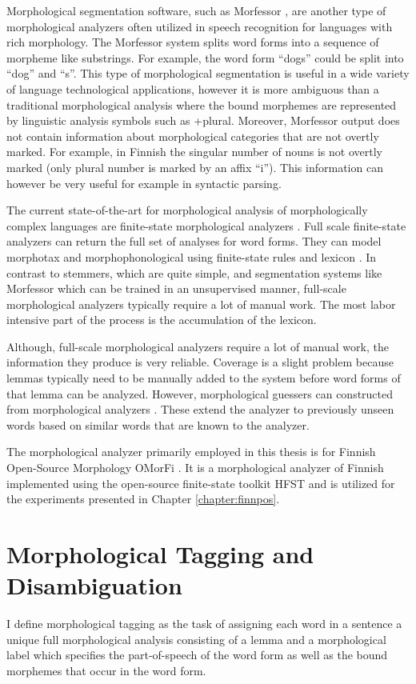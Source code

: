Morphological segmentation software, such as Morfessor
\cite{Creutz2002}, are another type of morphological analyzers often
utilized in speech recognition for languages with rich morphology. The
Morfessor system splits word forms into a sequence of morpheme like
substrings. For example, the word form ``dogs'' could be split into
``dog'' and ``s''.  This type of morphological segmentation is useful
in a wide variety of language technological applications, however it
is more ambiguous than a traditional morphological analysis where the
bound morphemes are represented by linguistic analysis symbols such as
+plural. Moreover, Morfessor output does not contain information about
morphological categories that are not overtly marked. For example, in
Finnish the singular number of nouns is not overtly marked (only
plural number is marked by an affix ``i''). This information can
however be very useful for example in syntactic parsing.

The current state-of-the-art for morphological analysis of
morphologically complex languages are finite-state morphological
analyzers \citep{Kaplan1994,Koskenniemi1984}. Full scale finite-state
analyzers can return the full set of analyses for word forms. They can
model morphotax and morphophonological using finite-state rules and
lexicon \citep{Beesley2003}. In contrast to stemmers, which are quite
simple, and segmentation systems like Morfessor which can be trained
in an unsupervised manner, full-scale morphological analyzers
typically require a lot of manual work. The most labor intensive part
of the process is the accumulation of the lexicon. 

Although, full-scale morphological analyzers require a lot of manual
work, the information they produce is very reliable. Coverage is a
slight problem because lemmas typically need to be manually added to
the system before word forms of that lemma can be analyzed. However,
morphological guessers can constructed from morphological analyzers
\cite{Linden2009}. These extend the analyzer to previously unseen
words based on similar words that are known to the analyzer.

The morphological analyzer primarily employed in this thesis is for
Finnish Open-Source Morphology OMorFi \citep{Pirinen2011}. It is a
morphological analyzer of Finnish implemented using the open-source
finite-state toolkit HFST \cite{Linden2009hfst} and is utilized for
the experiments presented in Chapter \ref{chapter:finnpos}.
 
\section{Morphological Tagging and Disambiguation}
I define morphological tagging as the task of assigning each word in a
sentence a unique full morphological analysis consisting of a lemma
and a morphological label which specifies the part-of-speech of the
word form as well as the bound morphemes that occur in the word form.

